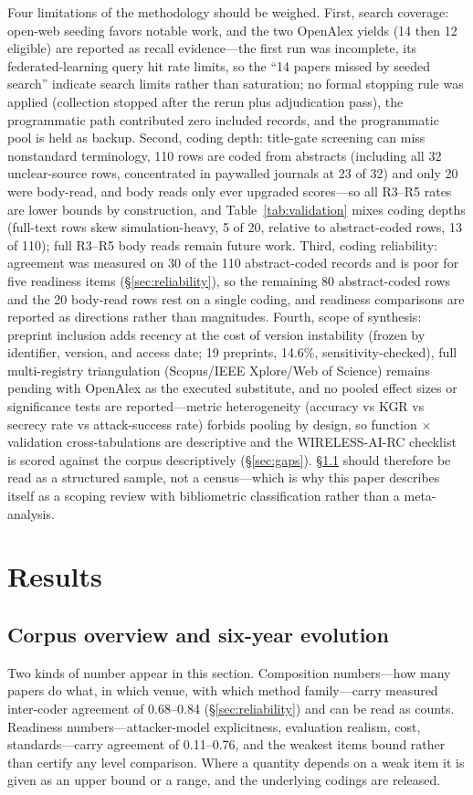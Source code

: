\documentclass[10.5pt,compsoc,winfonts]{ICN}
\begin{document}
Four limitations of the methodology should be weighed. First, search coverage: open-web seeding favors notable work, and the two OpenAlex yields (14 then 12 eligible) are reported as recall evidence—the first run was incomplete, its federated-learning query hit rate limits, so the “14 papers missed by seeded search” indicate search limits rather than saturation; no formal stopping rule was applied (collection stopped after the rerun plus adjudication pass), the programmatic path contributed zero included records, and the programmatic pool is held as backup. Second, coding depth: title-gate screening can miss nonstandard terminology, 110 rows are coded from abstracts (including all 32 unclear-source rows, concentrated in paywalled journals at 23 of 32) and only 20 were body-read, and body reads only ever upgraded scores—so all R3–R5 rates are lower bounds by construction, and Table~\ref{tab:validation} mixes coding depths (full-text rows skew simulation-heavy, 5 of 20, relative to abstract-coded rows, 13 of 110); full R3–R5 body reads remain future work. Third, coding reliability: agreement was measured on 30 of the 110 abstract-coded records and is poor for five readiness items (\S\ref{sec:reliability}), so the remaining 80 abstract-coded rows and the 20 body-read rows rest on a single coding, and readiness comparisons are reported as directions rather than magnitudes. Fourth, scope of synthesis: preprint inclusion adds recency at the cost of version instability (frozen by identifier, version, and access date; 19 preprints, 14.6\%, sensitivity-checked), full multi-registry triangulation (Scopus/IEEE Xplore/Web of Science) remains pending with OpenAlex as the executed substitute, and no pooled effect sizes or significance tests are reported—metric heterogeneity (accuracy vs KGR vs secrecy rate vs attack-success rate) forbids pooling by design, so function $\times$ validation cross-tabulations are descriptive and the WIRELESS-AI-RC checklist is scored against the corpus descriptively (\S\ref{sec:gaps}). \S\ref{sec:corpus} should therefore be read as a structured sample, not a census—which is why this paper describes itself as a scoping review with bibliometric classification rather than a meta-analysis.

\section{Results}
\subsection{Corpus overview and six-year evolution}
\label{sec:corpus}
Two kinds of number appear in this section. Composition numbers—how many papers do
what, in which venue, with which method family—carry measured inter-coder agreement of
0.68–0.84 (\S\ref{sec:reliability}) and can be read as counts. Readiness numbers—attacker-model
explicitness, evaluation realism, cost, standards—carry agreement of 0.11–0.76, and the
weakest items bound rather than certify any level comparison. Where a quantity depends on a weak
item it is given as an upper bound or a range, and the underlying codings are released.
\end{document}
